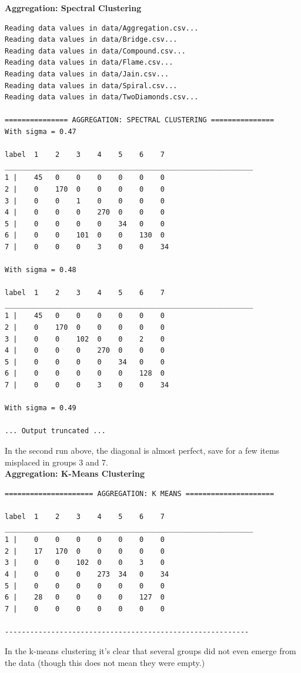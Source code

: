 \documentclass[11pt]{article}
\begin{document}
\textbf{Aggregation: Spectral Clustering}
\begin{verbatim}
Reading data values in data/Aggregation.csv...
Reading data values in data/Bridge.csv...
Reading data values in data/Compound.csv...
Reading data values in data/Flame.csv...
Reading data values in data/Jain.csv...
Reading data values in data/Spiral.csv...
Reading data values in data/TwoDiamonds.csv...

=============== AGGREGATION: SPECTRAL CLUSTERING ===============
With sigma = 0.47

label  1    2    3    4    5    6    7  
___________________________________________________________
1 |    45   0    0    0    0    0    0  
2 |    0    170  0    0    0    0    0  
3 |    0    0    1    0    0    0    0  
4 |    0    0    0    270  0    0    0  
5 |    0    0    0    0    34   0    0  
6 |    0    0    101  0    0    130  0  
7 |    0    0    0    3    0    0    34  

With sigma = 0.48

label  1    2    3    4    5    6    7   
___________________________________________________________
1 |    45   0    0    0    0    0    0   
2 |    0    170  0    0    0    0    0   
3 |    0    0    102  0    0    2    0   
4 |    0    0    0    270  0    0    0   
5 |    0    0    0    0    34   0    0   
6 |    0    0    0    0    0    128  0   
7 |    0    0    0    3    0    0    34   

With sigma = 0.49

... Output truncated ... 
\end{verbatim}
In the second run above, the diagonal is almost perfect, save for a few items misplaced in groups 3 and 7. 
\\[5pt]
\textbf{Aggregation: K-Means Clustering} 
\begin{verbatim}
===================== AGGREGATION: K MEANS =====================

label  1    2    3    4    5    6    7    
___________________________________________________________
1 |    0    0    0    0    0    0    0    
2 |    17   170  0    0    0    0    0    
3 |    0    0    102  0    0    3    0    
4 |    0    0    0    273  34   0    34    
5 |    0    0    0    0    0    0    0    
6 |    28   0    0    0    0    127  0    
7 |    0    0    0    0    0    0    0    

----------------------------------------------------------
\end{verbatim}
In the k-means clustering it's clear that several groups did not even emerge from the data (though this does not mean they were empty.)
\\[5pt]
\end{document}
